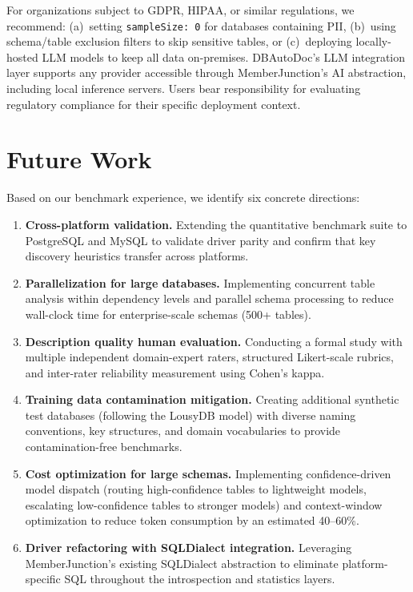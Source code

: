 \documentclass[twocolumn]{svjour3}
\begin{document}
For organizations subject to GDPR, HIPAA, or similar regulations, we recommend: (a)~setting \texttt{sampleSize:~0} for databases containing PII, (b)~using schema/table exclusion filters to skip sensitive tables, or (c)~deploying locally-hosted LLM models to keep all data on-premises. DBAutoDoc's LLM integration layer supports any provider accessible through MemberJunction's AI abstraction, including local inference servers. Users bear responsibility for evaluating regulatory compliance for their specific deployment context.


\section{Future Work}\label{sec:future}

Based on our benchmark experience, we identify six concrete directions:

\begin{enumerate}
    \item \textbf{Cross-platform validation.} Extending the quantitative benchmark suite to PostgreSQL and MySQL to validate driver parity and confirm that key discovery heuristics transfer across platforms.
    \item \textbf{Parallelization for large databases.} Implementing concurrent table analysis within dependency levels and parallel schema processing to reduce wall-clock time for enterprise-scale schemas (500+ tables).
    \item \textbf{Description quality human evaluation.} Conducting a formal study with multiple independent domain-expert raters, structured Likert-scale rubrics, and inter-rater reliability measurement using Cohen's kappa.
    \item \textbf{Training data contamination mitigation.} Creating additional synthetic test databases (following the LousyDB model) with diverse naming conventions, key structures, and domain vocabularies to provide contamination-free benchmarks.
    \item \textbf{Cost optimization for large schemas.} Implementing confidence-driven model dispatch (routing high-confidence tables to lightweight models, escalating low-confidence tables to stronger models) and context-window optimization to reduce token consumption by an estimated 40--60\%.
    \item \textbf{Driver refactoring with SQLDialect integration.} Leveraging MemberJunction's existing SQLDialect abstraction to eliminate platform-specific SQL throughout the introspection and statistics layers.
\end{enumerate}
\end{document}
